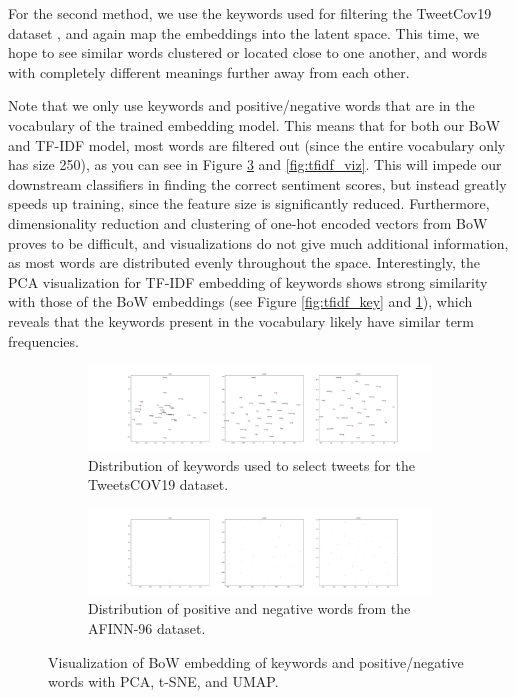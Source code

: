 For the second method, we use the keywords used for filtering the TweetCov19 dataset \cite{tweetsdataset}, and again map the embeddings into the latent space. This time, we hope to see similar words clustered or located close to one another, and words with completely different meanings further away from each other.

Note that we only use keywords and positive/negative words that are in the vocabulary of the trained embedding model. This means that for both our BoW and TF-IDF model, most words are filtered out (since the entire vocabulary only has size 250), as you can see in Figure \ref{fig:bow_viz} and \ref{fig:tfidf_viz}. This will impede our downstream classifiers in finding the correct sentiment scores, but instead greatly speeds up training, since the feature size is significantly reduced.
Furthermore, dimensionality reduction and clustering of one-hot encoded vectors from BoW proves to be difficult, and visualizations do not give much additional information, as most words are distributed evenly throughout the space.
Interestingly, the PCA visualization for TF-IDF embedding of keywords shows strong similarity with those of the BoW embeddings (see Figure \ref{fig:tfidf_key} and \ref{fig:bow_key}), which reveals that the keywords present in the vocabulary likely have similar term frequencies.
 
\begin{figure}
 \centering
 \begin{subfigure}{\columnwidth}
 \includegraphics[width=1\textwidth]{images/keywords_bow.pdf}
  \caption{Distribution of keywords used to select tweets for the TweetsCOV19 dataset.}
 \label{fig:bow_key}
 \end{subfigure}
 \centering
 \begin{subfigure}{\columnwidth}
 \includegraphics[width=1\textwidth]{images/keywords_bow_posneg.pdf}
  \caption{Distribution of positive and negative words from the AFINN-96 dataset.}
  \label{fig:bow_posneg}
 \end{subfigure}
 \caption{Visualization of BoW embedding of keywords and positive/negative words with PCA, t-SNE, and UMAP.}
 \label{fig:bow_viz}
\end{figure}

